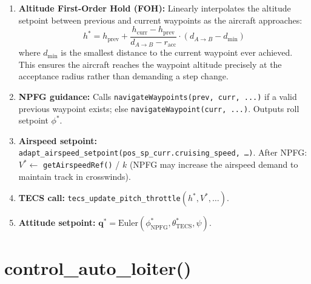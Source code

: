 \documentclass[12pt,a4paper]{article}
\begin{document}
\begin{enumerate}
  \item \textbf{Altitude First-Order Hold (FOH):}
        Linearly interpolates the altitude setpoint between previous
        and current waypoints as the aircraft approaches:
        \begin{equation}
          h^* = h_{\text{prev}} +
            \frac{h_{\text{curr}} - h_{\text{prev}}}{d_{A \to B} - r_{\text{acc}}}
            \cdot (d_{A \to B} - d_{\text{min}})
        \end{equation}
        where $d_{\text{min}}$ is the smallest distance to the current
        waypoint ever achieved. This ensures the aircraft reaches the
        waypoint altitude precisely at the acceptance radius rather than
        demanding a step change.

  \item \textbf{NPFG guidance:}
        Calls \texttt{navigateWaypoints(prev, curr, ...)} if a valid
        previous waypoint exists; else \texttt{navigateWaypoint(curr,
        ...)}. Outputs roll setpoint $\phi^*$.

  \item \textbf{Airspeed setpoint:}
        \texttt{adapt\_airspeed\_setpoint(pos\_sp\_curr.cruising\_speed, \ldots)}.
        After NPFG: $V^* \leftarrow$ \texttt{getAirspeedRef()} / $k$
        (NPFG may increase the airspeed demand to maintain track in
        crosswinds).

  \item \textbf{TECS call:} \texttt{tecs\_update\_pitch\_throttle}$(h^*, V^*, \ldots)$.

  \item \textbf{Attitude setpoint:}
        $\mathbf{q}^* = \text{Euler}(\phi^*_{\text{NPFG}}, \theta^*_{\text{TECS}}, \psi)$.
\end{enumerate}

\section{control\_auto\_loiter()}
\end{document}
